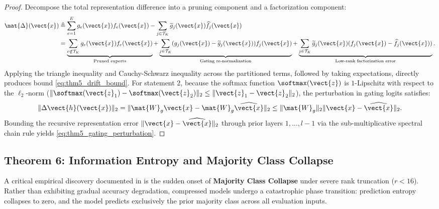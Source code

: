 \begin{proof}
Decompose the total representation difference into a pruning component and a factorization component:
\begin{align}
\mat{\Delta}(\vect{x}) &\triangleq \sum_{e=1}^E g_e(\vect{x}) f_e(\vect{x}) - \sum_{j \in \mathcal{T}_K} \widetilde{g}_j(\vect{x}) \widehat{f}_j(\vect{x}) \nonumber \\
&= \underbrace{\sum_{e \notin \mathcal{T}_K} g_e(\vect{x}) f_e(\vect{x})}_{\text{Pruned experts}} + \underbrace{\sum_{j \in \mathcal{T}_K} (g_j(\vect{x}) - \widetilde{g}_j(\vect{x})) f_j(\vect{x})}_{\text{Gating re-normalization}} + \underbrace{\sum_{j \in \mathcal{T}_K} \widetilde{g}_j(\vect{x}) (f_j(\vect{x}) - \widehat{f}_j(\vect{x}))}_{\text{Low-rank factorization error}}.
\end{align}
Applying the triangle inequality and Cauchy-Schwarz inequality across the partitioned terms, followed by taking expectations, directly produces bound \eqref{eq:thm5_drift_bound}. For statement 2, because the softmax function $\softmax(\vect{z})$ is $1$-Lipschitz with respect to the $\ell_2$-norm ($\|\softmax(\vect{z}_1) - \softmax(\vect{z}_2)\|_2 \le \|\vect{z}_1 - \vect{z}_2\|_2$), the perturbation in gating logits satisfies:
\begin{equation}
\| \Delta \vect{h}(\vect{x}) \|_2 = \| \mat{W}_g \vect{x} - \mat{W}_g \widehat{\vect{x}} \|_2 \le \|\mat{W}_g\|_2 \| \vect{x} - \widehat{\vect{x}} \|_2.
\end{equation}
Bounding the recursive representation error $\|\vect{x} - \widehat{\vect{x}}\|_2$ through prior layers $1, \dots, l-1$ via the sub-multiplicative spectral chain rule yields \eqref{eq:thm5_gating_perturbation}.
\end{proof}

\subsection{Theorem 6: Information Entropy and Majority Class Collapse}
\label{sec:thm_class_collapse}

A critical empirical discovery documented in  is the sudden onset of \textbf{Majority Class Collapse} under severe rank truncation ($r < 16$). Rather than exhibiting gradual accuracy degradation, compressed models undergo a catastrophic phase transition: prediction entropy collapses to zero, and the model predicts exclusively the prior majority class across all evaluation inputs.

